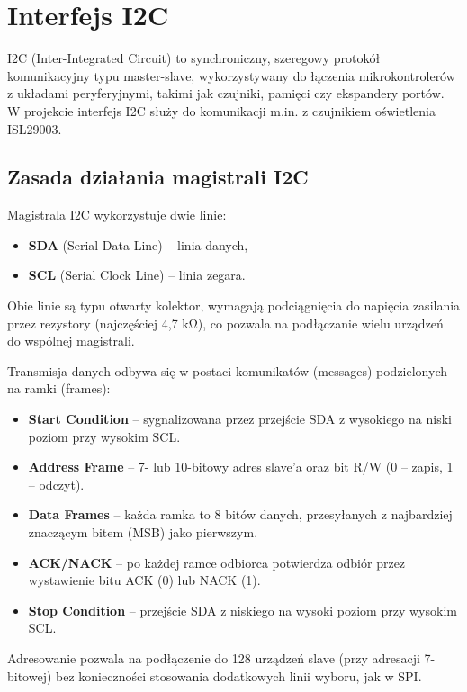 \documentclass[letterpaper,11pt]{report}
\begin{document}
\section{Interfejs I2C}

I2C (Inter-Integrated Circuit) to synchroniczny, szeregowy protokół komunikacyjny typu master-slave, wykorzystywany do łączenia mikrokontrolerów z układami peryferyjnymi, takimi jak czujniki, pamięci czy ekspandery portów. W projekcie interfejs I2C służy do komunikacji m.in. z czujnikiem oświetlenia ISL29003.

\subsection{Zasada działania magistrali I2C}

Magistrala I2C wykorzystuje dwie linie:
\begin{itemize}
    \item \textbf{SDA} (Serial Data Line) – linia danych,
    \item \textbf{SCL} (Serial Clock Line) – linia zegara.
\end{itemize}
Obie linie są typu otwarty kolektor, wymagają podciągnięcia do napięcia zasilania przez rezystory (najczęściej 4,7 k\si{\ohm}), co pozwala na podłączanie wielu urządzeń do wspólnej magistrali.

Transmisja danych odbywa się w postaci komunikatów (messages) podzielonych na ramki (frames):
\begin{itemize}
    \item \textbf{Start Condition} – sygnalizowana przez przejście SDA z wysokiego na niski poziom przy wysokim SCL.
    \item \textbf{Address Frame} – 7- lub 10-bitowy adres slave’a oraz bit R/W (0 – zapis, 1 – odczyt).
    \item \textbf{Data Frames} – każda ramka to 8 bitów danych, przesyłanych z najbardziej znaczącym bitem (MSB) jako pierwszym.
    \item \textbf{ACK/NACK} – po każdej ramce odbiorca potwierdza odbiór przez wystawienie bitu ACK (0) lub NACK (1).
    \item \textbf{Stop Condition} – przejście SDA z niskiego na wysoki poziom przy wysokim SCL.
\end{itemize}

Adresowanie pozwala na podłączenie do 128 urządzeń slave (przy adresacji 7-bitowej) bez konieczności stosowania dodatkowych linii wyboru, jak w SPI.
\end{document}
